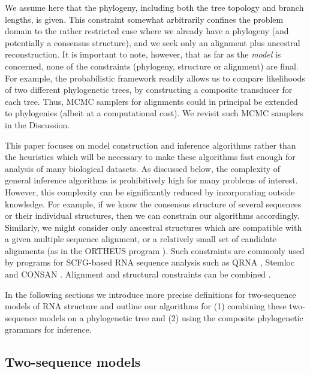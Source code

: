 \documentclass[10pt]{article}
\begin{document}
We assume here that the phylogeny, including both the tree topology and branch lengths, is given.
This constraint somewhat arbitrarily confines the problem domain to the rather restricted case where we already have a phylogeny (and potentially a consensus structure),
and we seek only an alignment plus ancestral reconstruction.
It is important to note, however, that as far as the {\em model} is concerned, none of the constraints (phylogeny, structure or alignment) are final.
For example, the probabilistic framework readily allows us to compare likelihoods of two different phylogenetic trees, by constructing a composite transducer for each tree.
Thus, MCMC samplers for alignments could in principal be extended to phylogenies (albeit at a computational cost).
We revisit such MCMC samplers in the Discussion.

This paper focuses on model construction and inference algorithms
rather than the heuristics which will be necessary to make these
algorithms fast enough for analysis of many biological datasets.
As discussed below, the complexity of general inference algorithms is
prohibitively high for many problems of interest.
However, this complexity can be significantly
reduced by incorporating outside knowledge.  For example, if we know
the consensus structure of several sequences or their individual
structures, then we can constrain our algorithms accordingly.
Similarly, we might consider only ancestral structures which are
compatible with a given multiple sequence alignment, or a relatively small set of candidate alignments (as in the ORTHEUS program \cite{PatenHolmesBirney2008}). 
Such constraints are
commonly used by programs for SCFG-based RNA sequence analysis such as QRNA \cite{RivasEddy2001}, Stemloc \cite{Holmes2005} and CONSAN \cite{DowellEddy2006}.
Alignment and structural constraints can be combined \cite{Holmes2005}.


In the following sections we introduce more precise definitions for two-sequence
models of RNA structure and outline our algorithms for
(1) combining these two-sequence models on a phylogenetic tree and
(2) using the composite phylogenetic grammars for inference.



\subsection*{Two-sequence models} 
\end{document}
